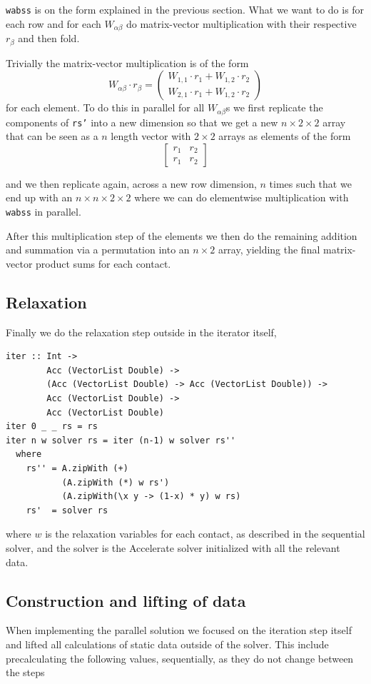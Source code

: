 \documentclass[runningheads,a4paper]{llncs}
\begin{document}
\texttt{wabss} is on the form explained in the previous section.
What we want to do is for each row and for each $W_{\alpha\beta}$
do matrix-vector multiplication with their respective $r_\beta$
and then fold.

Trivially the matrix-vector multiplication is of the form
\[
W_{\alpha\beta} \cdot r_\beta = 
\begin{pmatrix}
W_{1,1} \cdot r_{1} + W_{1,2} \cdot r_{2} \\
W_{2,1} \cdot r_{1} + W_{1,2} \cdot r_{2}
\end{pmatrix}
\]
for each element.
To do this in parallel for all $W_{\alpha\beta}$s
we first replicate the components of \texttt{rs'}
into a new dimension so that we get a new $n \times 2 \times 2$
array that can be seen as a $n$ length vector with $2 \times 2$
arrays as elements of the form
\[
\begin{bmatrix}
r_{1} & r_{2} \\
r_{1} & r_{2}
\end{bmatrix}
\]

and we then replicate again, across a new row dimension,
$n$ times such that we end up with an $n \times n \times 2 \times 2$
where we can do elementwise multiplication with \texttt{wabss} in parallel.

After this multiplication step of the elements we then do the remaining addition and summation
via a permutation into an $n \times 2$ array, yielding the final matrix-vector product sums
for each contact.

\subsection{Relaxation}
Finally we do the relaxation step outside in the iterator itself,
\begin{verbatim}
iter :: Int ->
        Acc (VectorList Double) ->
        (Acc (VectorList Double) -> Acc (VectorList Double)) ->
        Acc (VectorList Double) ->
        Acc (VectorList Double)
iter 0 _ _ rs = rs
iter n w solver rs = iter (n-1) w solver rs''
  where
    rs'' = A.zipWith (+)
           (A.zipWith (*) w rs')
           (A.zipWith(\x y -> (1-x) * y) w rs)
    rs'  = solver rs
\end{verbatim}
where $w$ is the relaxation variables for each contact,
as described in the sequential solver,
and the solver is the Accelerate solver initialized
with all the relevant data.

\subsection{Construction and lifting of data\label{dataconstruction}}
When implementing the parallel solution
we focused on the iteration step itself
and lifted all calculations of static data
outside of the solver.
This include precalculating the following values,
sequentially, as they do not change between the steps
\end{document}

